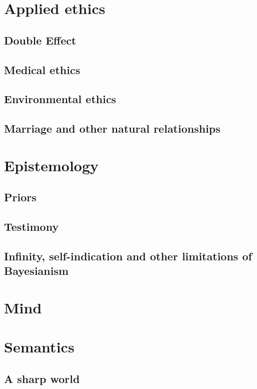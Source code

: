
\def\mychapter{III}
\chapter{Applied ethics}\label{ch:applied-ethics}
\section{Double Effect}
\section{Medical ethics}
\section{Environmental ethics}
\section{Marriage and other natural relationships}
\chaptertail

\def\mychapter{IV}

\chapter{Epistemology}\label{ch:epistemology}
\section{Priors}
\section{Testimony}
\section{Infinity, self-indication and other limitations of Bayesianism}
\chaptertail 

\def\mychapter{V}

\chapter{Mind}\label{ch:mind}
\chaptertail 

\def\mychapter{VI}

\chapter{Semantics}\label{ch:semantics}
\section{A sharp world}
\chaptertail

